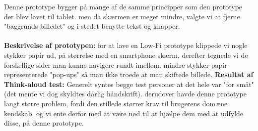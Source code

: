 Denne prototype bygger på mange af de samme principper som den prototype der blev lavet til tablet. men da skærmen er meget mindre, valgte vi at fjerne "baggrunds billedet" og i stedet benytte tekst og knapper.\\\\ \textbf{Beskrivelse af prototypen:} for at lave en Low-Fi prototype klippede vi nogle stykker papir ud, på størrelse med en smartphone skærm, derefter tegnede vi de forskellige sider man kunne navigere rundt imellem. mindre stykker papir representerede "pop-ups" så man ikke troede at man skiftede billede. \textbf{Resultat af Think-aloud test:} Generelt syntes begge test personer at det hele var "for småt" (det mente vi dog skyldtes dårlig håndskrift). derudover havde denne prototype langt større problem, fordi den stillede størrer krav til brugerens domæne kendskab. og vi ente derfor med at være nød til at hjælpe dem med at udfylde disse, på denne prototype.
